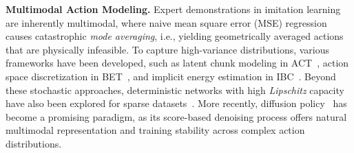 \textbf{Multimodal Action Modeling.}
Expert demonstrations in imitation learning are inherently multimodal, where naive mean square error (MSE) regression causes catastrophic \textit{mode averaging}, i.e., yielding geometrically averaged actions that are physically infeasible. To capture high-variance distributions, various frameworks have been developed, such as latent chunk modeling in {ACT}~\citep{wang2017robust,zhao2023learning}, action space discretization in {BET}~\citep{shafiullah2022behavior, lee2024behavior}, and implicit energy estimation in {IBC}~\citep{florence2021implicit}. Beyond these stochastic approaches, deterministic networks with high \textit{Lipschitz} capacity have also been explored for sparse datasets~\citep{pan2025much}. More recently, diffusion policy~\citep{dp, ddpm, song2020score} has become a promising paradigm, as its score-based denoising process offers natural multimodal representation and training stability across complex action distributions.




